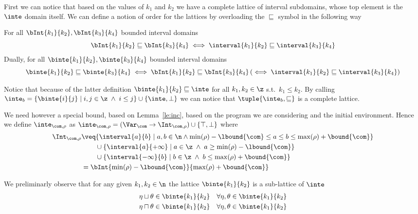 %
First we can notice that based on the values of \(k_1\) and \(k_2\) we
have a complete lattice of interval subdomains, whose top element is
the \(\inte\) domain itself. We can define a notion of order for the
lattices by overloading the \(\sqsubseteq\) symbol in the following
way

\begin{definition}
  For all \(\bInt{k_1}{k_2}, \bInt{k_3}{k_4}\) bounded interval
  domains
  \begin{equation*}
    \bInt{k_1}{k_2} \sqsubseteq \bInt{k_3}{k_4} \iff \interval{k_1}{k_2} \sqsubseteq \interval{k_3}{k_4}
  \end{equation*}
  \noindent
  Dually, for all \(\binte{k_1}{k_2}, \binte{k_3}{k_4}\) bounded
  interval domains
  \begin{equation*}
    \binte{k_1}{k_2} \sqsubseteq \binte{k_3}{k_4} \iff \bInt{k_1}{k_2} \sqsubseteq \bInt{k_3}{k_4}
    \left(\iff \interval{k_1}{k_2} \sqsubseteq \interval{k_3}{k_4} \right)
  \end{equation*}
\end{definition}

Notice that because of the latter definition
\(\binte{k_1}{k_2} \sqsubseteq \inte\) for all \(k_1, k_2 \in \z\)
s.t.\ \(k_1 \leq k_2\). By calling
\(\inte_b = \{\binte{i}{j} \mid i,j \in \z \; \land \; i \leq j\} \cup
\{\inte, \bot\}\) we can notice that \(\tuple{\inte_b, \sqsubseteq}\)
is a complete lattice.

\noindent
We need however a special bound, based on Lemma~\ref{le:inc}, based on
the program we are considering and the initial environment.  Hence we
define \(\inte_{\com,\rho}\) as
\({\inte_{\com,\rho} = (\Var_{\com} \to \Int_{\com,\rho}) \cup \{
  \top, \bot \}}\) where
\begin{align*}
  \Int_{\com,\rho} & \veq \{ \interval{a}{b} \mid a, b \in \n \land
                     \min(\rho) - \lbound{\com} \leq a \leq b \leq \max(\rho) + \bound{\com}\} \\
                   & \phantom{\veq} \cup \{\interval{a}{+\infty} \mid a \in\z \; \land \; a \geq \min(\rho) - \lbound{\com}\} \\
                   & \phantom{\veq} \cup \{\interval{-\infty}{b} \mid b \in\z \; \land \; b \leq \max(\rho) + \bound{\com}\} \\
                   & = \bInt{\min(\rho)-\lbound{\com}}{\max(\rho) + \bound{\com}}
\end{align*}

We preliminarly observe that for any given \(k_1,k_2\in\n\) the
lattice \(\binte{k_1}{k_2}\) is a sub-lattice of \(\inte\)
\begin{align*}
  \eta \sqcup \theta & \in \binte{k_1}{k_2} & \forall \eta,\theta \in \binte{k_1}{k_2} \\
  \eta \sqcap \theta & \in \binte{k_1}{k_2} & \forall \eta,\theta \in \binte{k_1}{k_2}
\end{align*}


